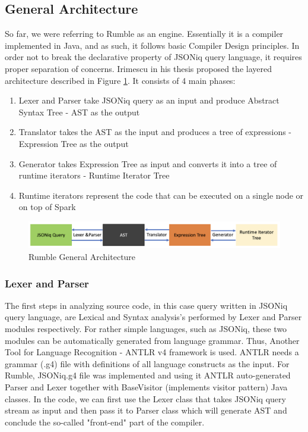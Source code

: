 \subsection{General Architecture}
\label{sec:RumbleArchitecture}
So far, we were referring to Rumble as an engine. Essentially it is a compiler implemented in Java, and as such, it follows basic Compiler Design principles. In order not to break the declarative property of JSONiq query language, it requires proper separation of concerns. Irimescu in his thesis \cite{RumbleThesis} proposed the layered architecture described in Figure \ref{fig:Rumble_General_Architecture}. It consists of 4 main phases:
\begin{enumerate}
	\item Lexer and Parser take JSONiq query as an input and produce Abstract Syntax Tree - AST as the output 
	\item Translator takes the AST as the input and produces a tree of expressions - Expression Tree as the output
	\item Generator takes Expression Tree as input and converts it into a tree of runtime iterators - Runtime Iterator Tree
	\item Runtime iterators represent the code that can be executed on a single node or on top of Spark
\end{enumerate} 

\begin{figure}[h!]
	\includegraphics[width=\linewidth]{parsing_architecture.png}
	\vspace*{-5mm}
	\caption{Rumble General Architecture}
	\label{fig:Rumble_General_Architecture}
\end{figure}

\subsubsection{Lexer and Parser}
\label{sec:RumbleLexerParser}
The first steps in analyzing source code, in this case query written in JSONiq query language, are Lexical and Syntax analysis's performed by Lexer and Parser modules respectively. For rather simple languages, such as JSONiq, these two modules can be automatically generated from language grammar. Thus, Another Tool for Language Recognition - ANTLR v4 framework \cite{ANTLR} is used. ANTLR needs a grammar (.g4) file with definitions of all language constructs as the input. For Rumble, JSONiq.g4 file was implemented and using it ANTLR auto-generated Parser and Lexer together with BaseVisitor (implements visitor pattern) Java classes. In the code, we can first use the Lexer class that takes JSONiq query stream as input and then pass it to Parser class which will generate AST and conclude the so-called "front-end" part of the compiler.

